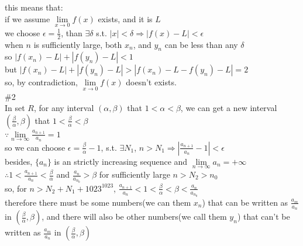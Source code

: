 \documentclass{article}
\begin{document}
this means that:\\

if we assume $\lim \limits_{x \to 0}f(x)$ exists, and it is $L$\\

we choose $\epsilon=\displaystyle\frac{1}{2}$, than $\exists\delta$ s.t. $|x|<\delta\Rightarrow|f(x)-L|<\epsilon$\\

when $n$ is sufficiently large, both $x_n$, and $y_n$ can be less than any $\delta$\\

so $|f(x_n)-L|+|f(y_n)-L|<1$\\

but $|f(x_n)-L|+|f(y_n)-L|>|f(x_n)-L-f(y_n)-L|=2$\\

so, by contradiction, $\lim \limits_{x \to 0}f(x)$ doesn't exists.\\

\textcolor[rgb]{0.00,0.00,0.50}{\#2}\\

In set $R$, for any interval $(\alpha,\beta)$ that $1<\alpha<\beta$, we can get a new interval $\displaystyle(\frac{\beta}{\alpha},\beta)$ that $1<\displaystyle\frac{\beta}{\alpha}<\beta$\\

$\because$\qquad$\lim \limits_{n \to \infty}\displaystyle\frac{a_{n+1}}{a_n}=1$\\

so we can choose $\epsilon=\displaystyle\frac{\beta}{\alpha}-1$, s.t. $\exists N_1$, $n>N_1\Rightarrow\left|\displaystyle\frac{a_{n+1}}{a_n}-1\right|<\epsilon$\\

besides, $\{a_n\}$ is an strictly increasing sequence and $\lim \limits_{n \to \infty}a_n=+\infty$\\

$\therefore$\qquad$1<\displaystyle\frac{a_{n+1}}{a_n}<\frac{\beta}{\alpha}$ and $\displaystyle\frac{a_n}{a_{n_0}}>\beta$ for sufficiently large
$ n>N_2>n_0$\\

so, for $n>N_2+N_1+1023^{1023}$, $\displaystyle\frac{a_{n+1}}{a_n}<1<\frac{\beta}{\alpha}<\beta<\frac{a_n}{a_{n_0}}$\\

therefore there must be some numbers(we can them $x_n$) that can be written as $\displaystyle\frac{a_m}{a_n}$ in $(\displaystyle\frac{\beta}{\alpha},\beta)$, and there will also be other numbers(we call them $y_n$) that can't be written as $\displaystyle\frac{a_m}{a_n}$ in $(\displaystyle\frac{\beta}{\alpha},\beta)$\\
\end{document}
